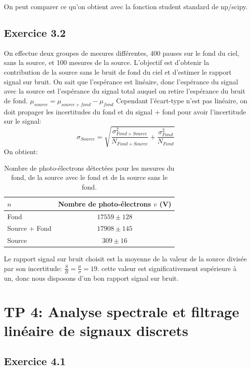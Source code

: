 \documentclass[a4paper, 11pt]{article}
\begin{document}
	On peut comparer ce qu'on obtient avec la fonction student standard de np/scipy.
	
	\subsection{Exercice 3.2}
	
	On effectue deux groupes de mesures différentes, 400 pauses sur le fond du ciel, sans la source, et 100 mesures de la source. L'objectif est d'obtenir la contribution de la source sans le bruit de fond du ciel et d'estimer le rapport signal sur bruit.
	On sait que l'espérance est linéaire, donc l'espérance du signal avec la source est l'espérance du signal total auquel on retire l'espérance du bruit de fond.
	$\mu_{source} = \mu_{source + fond} - \mu_{fond}$
	Cependant l'écart-type n'est pas linéaire, on doit propager les incertitudes du fond et du signal + fond pour avoir l'incertitude sur le signal: $$\sigma_{Source} = \sqrt{\frac{\sigma_{Fond+Source}^2}{N_{Fond + Source}} + \frac{\sigma_{Fond}^2}{N_{Fond}}}$$
	On obtient:
	
	\begin{table}[H]
		\centering
		\begin{tabular}{lc}
			\toprule
			$n$ & Nombre de photo-électrons $v$ (V) \\
			\midrule
			Fond   & $17559 \pm 128$ \\
			Source + Fond  & $17908 \pm 145$ \\
			Source  & $309 \pm 16$ \\
			\bottomrule
		\end{tabular}
		\caption{Nombre de photo-électrons détectées pour les mesures du fond, de la source avec le fond et de la source sans le fond.}
		\label{tab:mesures_visible}
	\end{table}
	
	Le rapport signal sur bruit choisit est la moyenne de la valeur de la source divisée par son incertitude: $\frac{S}{B} = \frac{\mu}{\sigma} = 19$. cette valeur est significativement supérieure à un, donc nous disposons d'un bon rapport signal sur bruit.
	
	\section{TP 4: Analyse spectrale et filtrage linéaire de signaux discrets}
	\subsection{Exercice 4.1}
	
\end{document}
